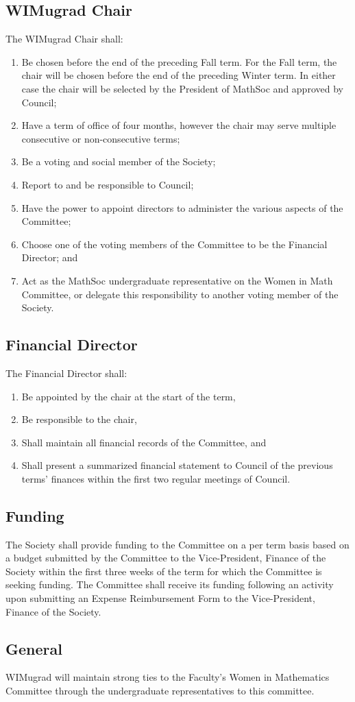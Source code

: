 \subsection{WIMugrad Chair}
The WIMugrad Chair shall:
\begin{enumerate}
\item Be chosen before the end of the preceding Fall term. For the Fall term, the chair will be chosen before the end of the preceding Winter term. In either case the chair will be selected by the President of MathSoc and approved by Council;
\item Have a term of office of four months, however the chair may serve multiple consecutive or non-consecutive terms;
\item Be a voting and social member of the Society;
\item Report to and be responsible to Council;
\item Have the power to appoint directors to administer the various aspects of the Committee;
\item Choose one of the voting members of the Committee to be the Financial Director; and
\item Act as the MathSoc undergraduate representative on the Women in Math Committee, or delegate this responsibility to another voting member of the Society.
\end{enumerate}

\subsection{Financial Director}
The Financial Director shall:
\begin{enumerate}
\item Be appointed by the chair at the start of the term,
\item Be responsible to the chair,
\item Shall maintain all financial records of the Committee, and
\item Shall present a summarized financial statement to Council of the previous terms' finances within the first two regular meetings of Council.
\end{enumerate}

\subsection{Funding}
The Society shall provide funding to the Committee on a per term basis based on a budget submitted by the Committee to the Vice-President, Finance of the Society within the first three weeks of the term for which the Committee is seeking funding.
The Committee shall receive its funding following an activity upon submitting an Expense Reimbursement Form to the Vice-President, Finance of the Society.

\subsection{General}
WIMugrad will maintain strong ties to the Faculty's Women in Mathematics Committee through the undergraduate representatives to this committee.